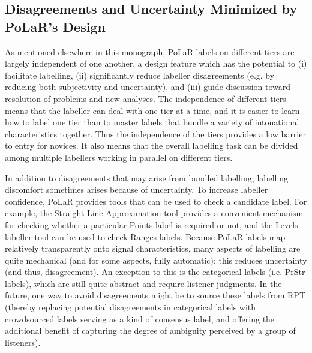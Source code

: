 \documentclass[11pt, twoside]{memoir}
\begin{document}
\subsection{Disagreements and Uncertainty Minimized by PoLaR’s Design}\label{sec:reducing-inter-labeller-disagreement}

As mentioned elsewhere in this monograph, PoLaR labels on different tiers are largely independent of one another, a design feature which has the potential to (i) facilitate labelling, (ii) significantly reduce labeller disagreements (e.g.  by reducing both subjectivity and uncertainty), and (iii) guide discussion toward resolution of problems and new analyses. The independence of different tiers means that the labeller can deal with one tier at a time, and it is easier to learn how to label one tier than to master labels that bundle a variety of intonational characteristics together.  Thus the independence of the tiers provides a low barrier to entry for novices. It also means that the overall labelling task can be divided among multiple labellers working in parallel on different tiers.

In addition to disagreements that may arise from bundled labelling, labelling discomfort sometimes arises because of uncertainty.  To increase labeller confidence, PoLaR provides tools that can be used to check a candidate label.  For example, the Straight Line Approximation tool provides a convenient mechanism for checking whether a particular Points label is required or not, and the Levels labeller tool can be used to check Ranges labels.  Because PoLaR labels map relatively transparently onto signal characteristics, many aspects of labelling are quite mechanical (and for some aspects, fully automatic); this reduces uncertainty (and thus, disagreement). An exception to this is the categorical labels (i.e. PrStr labels), which are still quite abstract and require listener judgments. In the future, one way to avoid disagreements might be to source these labels from RPT (thereby replacing potential disagreements in categorical labels with crowdsourced labels serving as a kind of consensus label, and offering the additional benefit of capturing the degree of ambiguity perceived by a group of listeners). 
\end{document}
